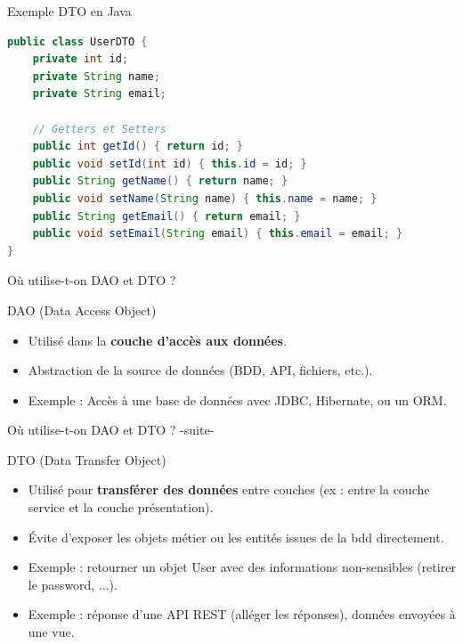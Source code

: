 \documentclass[aspectratio=169,10pt]{beamer}
\begin{document}
\begin{frame}[fragile]{Exemple DTO en Java}
        \begin{lstlisting}[language=Java]
public class UserDTO {
    private int id;
    private String name;
    private String email;

    // Getters et Setters
    public int getId() { return id; }
    public void setId(int id) { this.id = id; }
    public String getName() { return name; }
    public void setName(String name) { this.name = name; }
    public String getEmail() { return email; }
    public void setEmail(String email) { this.email = email; }
}
        \end{lstlisting}
\end{frame}


\begin{frame}{Où utilise-t-on DAO et DTO ?}
    \begin{block}{DAO (Data Access Object)}
        \begin{itemize}
            \item Utilisé dans la \textbf{couche d'accès aux données}.
            \item Abstraction de la source de données (BDD, API, fichiers, etc.).
            \item Exemple : Accès à une base de données avec JDBC, Hibernate, ou un ORM.
        \end{itemize}
    \end{block}
\end{frame}

\begin{frame}{Où utilise-t-on DAO et DTO ? -suite-}    
    \begin{block}{DTO (Data Transfer Object)}
        \begin{itemize}
            \item Utilisé pour \textbf{transférer des données} entre couches (ex : entre la couche service et la couche présentation).
            \item Évite d'exposer les objets métier ou les entités issues de la bdd directement.
            \item Exemple : retourner un objet User avec des informations non-sensibles (retirer le password, ...).
            \item Exemple : réponse d'une API REST (alléger les réponses), données envoyées à une vue.
        \end{itemize}
    \end{block}
\end{frame}
\end{document}
